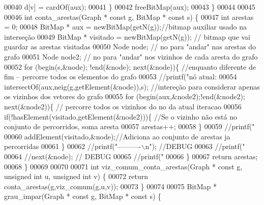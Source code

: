 \begin{DoxyCode}
00040                 d[v] = cardOf(aux);
00041         \}
00042         freeBitMap(aux);
00043 \}
00044 
00045 
00046 \textcolor{keywordtype}{int} conta_arestas(Graph * \textcolor{keyword}{const} g, BitMap * \textcolor{keyword}{const} s) \{
00047         \textcolor{keywordtype}{int} arestas = 0;
00048         BitMap * aux = newBitMap(getN(g));\textcolor{comment}{//bitmap auxiliar usado na interseção}
00049         BitMap * visitado = newBitMap(getN(g)); \textcolor{comment}{// bitmap que vai guardar as arestas visitadas}
00050     Node node; \textcolor{comment}{// no para "andar" nas arestas do grafo}
00051     Node node2; \textcolor{comment}{// no para "andar" nos vizinhos de cada aresta do grafo}
00052         \textcolor{keywordflow}{for} (begin(s,&node); !end(&node); next(&node))\{ \textcolor{comment}{//enquanto diferente de fim -- percorre todos os
       elementos do grafo}
00053                 \textcolor{comment}{//printf("nó atual:%
00054                 intersectOf(aux,neig(g,getElement(&node)),s); \textcolor{comment}{//intereção para considerar apenas os
       vizinhos dos vetores do grafo}
00055         \textcolor{keywordflow}{for} (begin(aux,&node2);!end(&node2); next(&node2))\{ \textcolor{comment}{// percorre todos os vizinhos do no da atual
       iteracao}
00056             \textcolor{keywordflow}{if}(!hasElement(visitado,getElement(&node2)))\{ \textcolor{comment}{//Se o vizinho não está no conjunto de
       percorridos, soma aresta}
00057                 arestas++;
00058                 \}
00059         \textcolor{comment}{//printf("%
00060         addElement(visitado,&node);\textcolor{comment}{//Adiciona ao conjunto de arestas ja percorridas}
00061         \}
00062                 \textcolor{comment}{//printf("----------\(\backslash\)n");   //DEBUG}
00063                 \textcolor{comment}{//printf("%
00064                 \textcolor{comment}{//next(&node); // DEBUG}
00065                 \textcolor{comment}{//printf("%
00066         \}
00067     \textcolor{keywordflow}{return} arestas;
00068 \}
00069 
00070 
00071 \textcolor{keywordtype}{int} viz_comum_conta_arestas(Graph * \textcolor{keyword}{const} g, \textcolor{keywordtype}{unsigned} \textcolor{keywordtype}{int} u, \textcolor{keywordtype}{unsigned} \textcolor{keywordtype}{int} v) \{
00072         \textcolor{keywordflow}{return} conta_arestas(g,viz_comum(g,u,v));
00073 \}
00074 
00075 BitMap * grau_impar(Graph * \textcolor{keyword}{const} g, BitMap * \textcolor{keyword}{const} s) \{
}}}}
\end{DoxyCode}
